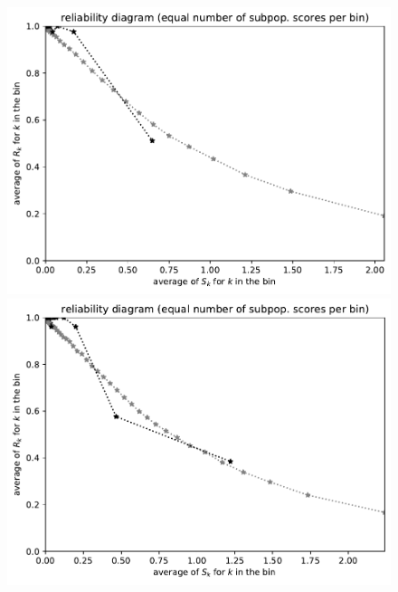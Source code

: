 \documentclass{article}
\begin{document}
\begin{figure}
\begin{centering}
\parbox{\imsize}{\includegraphics[width=\imsize]
{./codes/unweighted/nll-1-323-monarch-monarch-butterfly-milkweed-butterfly-Danaus-plexippusequisamps30}}
\quad\quad
\parbox{\imsize}{\includegraphics[width=\imsize]
{./codes/unweighted/nll-1-323-monarch-monarch-butterfly-milkweed-butterfly-Danaus-plexippusequisamps50}}

\vspace{\vertsep}


\end{centering}
\end{figure}
\end{document}
